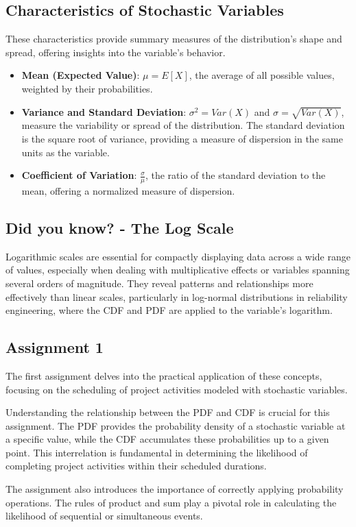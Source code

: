 \subsection*{Characteristics of Stochastic Variables}
These characteristics provide summary measures of the distribution's shape and spread, offering insights into the variable's behavior.

\begin{itemize}
    \item \textbf{Mean (Expected Value)}: \( \mu = E[X] \), the average of all possible values, weighted by their probabilities.
    \item \textbf{Variance and Standard Deviation}: \( \sigma^2 = Var(X) \) and \( \sigma = \sqrt{Var(X)} \), measure the variability or spread of the distribution. The standard deviation is the square root of variance, providing a measure of dispersion in the same units as the variable.
    \item \textbf{Coefficient of Variation}: \( \frac{\sigma}{\mu} \), the ratio of the standard deviation to the mean, offering a normalized measure of dispersion.
\end{itemize}
\newpage
\subsection*{Did you know? - The Log Scale}
\begin{mdframed}[backgroundcolor=gray!20] 
Logarithmic scales are essential for compactly displaying data across a wide range of values, especially when dealing with multiplicative effects or variables spanning several orders of magnitude. They reveal patterns and relationships more effectively than linear scales, particularly in log-normal distributions in reliability engineering, where the CDF and PDF are applied to the variable's logarithm.
\end{mdframed} 

\subsection*{Assignment 1}
The first assignment delves into the practical application of these concepts, focusing on the scheduling of project activities modeled with stochastic variables.

Understanding the relationship between the PDF and CDF is crucial for this assignment. The PDF provides the probability density of a stochastic variable at a specific value, while the CDF accumulates these probabilities up to a given point. This interrelation is fundamental in determining the likelihood of completing project activities within their scheduled durations.

The assignment also introduces the importance of correctly applying probability operations. The rules of product and sum play a pivotal role in calculating the likelihood of sequential or simultaneous events.